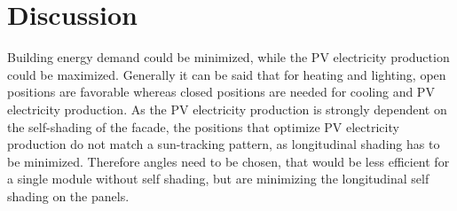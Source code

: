 \chapter{Discussion}
\label{ch:discussion}

Building energy demand could be minimized, while the PV electricity production could be maximized. Generally it can be said that for heating and lighting, open positions are favorable whereas closed positions are needed for cooling and PV electricity production. As the PV electricity production is strongly dependent on the self-shading of the facade, the positions that optimize PV electricity production do not match a sun-tracking pattern, as longitudinal shading has to be minimized. Therefore angles need to be chosen, that would be less efficient for a single module without self shading, but are minimizing the longitudinal self shading on the panels. 